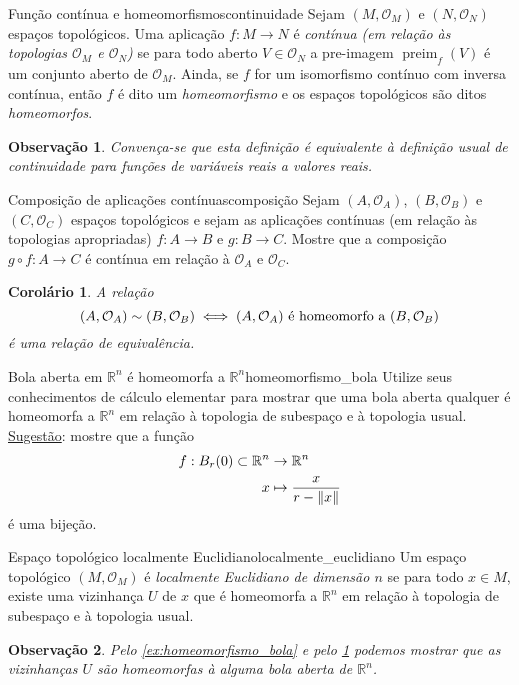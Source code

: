 \documentclass[12pt,a4paper]{article}
\numberwithin{equation}{section}
\DeclarePairedDelimiter\norm{\lVert}{\rVert}
\newcommand\preim[2]{\operatorname{preim}_{#1}{\left(#2\right)}}
\newcommand\topology[1]{\ensuremath{\left(#1, \mathcal{O}_{#1}\right)}}
\newtheorem{remark}{Observação}[section]
\newtheorem{corollary}{Corolário}[section]
\begin{document}
\begin{definition}{Função contínua e homeomorfismos}{continuidade}
    Sejam \topology{M} e \topology{N} espaços topológicos. Uma aplicação \(f : M \to N\) é \emph{contínua (em relação às topologias \(\mathcal{O}_M\) e \(\mathcal{O}_N\))} se para todo aberto \(V \in \mathcal{O}_N\) a pre-imagem \(\preim{f}{V}\) é um conjunto aberto de \(\mathcal{O}_M\). Ainda, se \(f\) for um isomorfismo contínuo com inversa contínua, então \(f\) é dito um \emph{homeomorfismo} e os espaços topológicos são ditos \emph{homeomorfos}.
\end{definition}
\begin{remark}
    Convença-se que esta definição é equivalente à definição usual de continuidade para funções de variáveis reais a valores reais.
\end{remark}

\begin{exercício}{Composição de aplicações contínuas}{composição}
    Sejam \topology{A}, \topology{B} e \topology{C} espaços topológicos e sejam as aplicações contínuas (em relação às topologias apropriadas) \(f : A \to B\) e \(g : B \to C\). Mostre que a composição \(g \circ f: A \to C\) é contínua em relação à \(\mathcal{O}_A\) e \(\mathcal{O}_C\).
\end{exercício}
\begin{corollary}
    \label{col:homeomorfo}
    A relação \[\topology{A} \sim \topology{B} \iff \text{\topology{A} é homeomorfo a \topology{B}}\] é uma relação de equivalência.
\end{corollary}

\begin{exercício}{Bola aberta em \(\mathbb{R}^n\) é homeomorfa a \(\mathbb{R}^n\)}{homeomorfismo_bola}
    Utilize seus conhecimentos de cálculo elementar para mostrar que uma bola aberta qualquer é homeomorfa a \(\mathbb{R}^n\) em relação à topologia de subespaço e à topologia usual. \underline{Sugestão}: mostre que a função
    \begin{align*}
        f : B_r(0) \subset \mathbb{R}^n &\to \mathbb{R}^n \\
                                      x &\mapsto \frac{x}{r - \norm{x}}
    \end{align*}
    é uma bijeção.
\end{exercício}

\begin{definition}{Espaço topológico localmente Euclidiano}{localmente_euclidiano}
    Um espaço topológico \topology{M} é \emph{localmente Euclidiano de dimensão \(n\)} se para todo \(x \in M\), existe uma vizinhança \(U\) de \(x\) que é homeomorfa a \(\mathbb{R}^n\) em relação à topologia de subespaço e à topologia usual.
\end{definition}
\begin{remark}
    Pelo \cref{ex:homeomorfismo_bola} e pelo \cref{col:homeomorfo} podemos mostrar que as vizinhanças \(U\) são homeomorfas à alguma bola aberta de \(\mathbb{R}^n\).
\end{remark}
\end{document}
